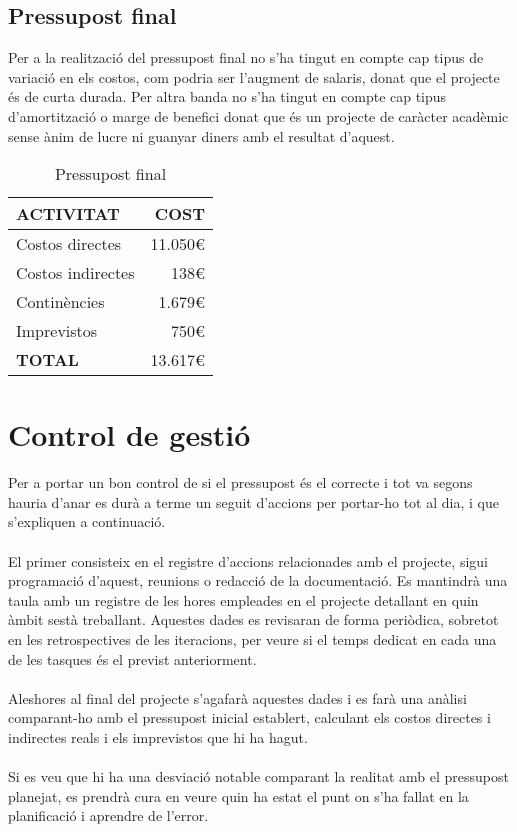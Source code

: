 \subsection{Pressupost final}

Per a la realització del pressupost final no s'ha tingut en compte cap tipus de variació en els costos, com podria ser l'augment de salaris, donat que el projecte és de curta durada. Per altra banda no s'ha tingut en compte cap tipus d'amortització o marge de benefici donat que és un projecte de caràcter acadèmic sense ànim de lucre ni guanyar diners amb el resultat d'aquest.
\\
\begin{table}[H]
\centering
\begin{tabular}{ | l | r |}
\hline
\textbf{ACTIVITAT} &\textbf{COST} \\ \hline
Costos directes & 11.050\euro \\ \hline
Costos indirectes & 138\euro \\ \hline
Continències & 1.679\euro \\ \hline
Imprevistos & 750\euro \\ \hline
\textbf{TOTAL} & 13.617\euro \\
\hline
\end{tabular}
\caption{Pressupost final}
\end{table}


\section{Control de gestió}

Per a portar un bon control de si el pressupost és el correcte i tot va segons hauria d'anar es durà a terme un seguit d'accions per portar-ho tot al dia, i que s'expliquen a continuació.
\\\\
El primer consisteix en el registre d'accions relacionades amb el projecte, sigui programació d'aquest, reunions o redacció de la documentació. Es mantindrà una taula amb un registre de les hores empleades en el projecte detallant en quin àmbit sestà treballant. Aquestes dades es revisaran de forma periòdica, sobretot en les retrospectives de les iteracions, per veure si el temps dedicat en cada una de les tasques és el previst anteriorment.
\\\\
Aleshores al final del projecte s'agafarà aquestes dades i es farà una anàlisi comparant-ho amb el pressupost inicial establert, calculant els costos directes i indirectes reals i els imprevistos que hi ha hagut.
\\\\
Si es veu que hi ha una desviació notable comparant la realitat amb el pressupost planejat, es prendrà cura en veure quin ha estat el punt on s'ha fallat en la planificació i aprendre de l'error.